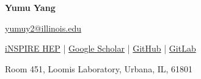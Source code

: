 \documentclass[a4paper,11pt]{article}
\newcommand{\socialicon}[1]{\raisebox{-0.05em}{\resizebox{!}{1em}{#1}}}
\newcommand{\ieeeicon}[1]{\raisebox{-0.3em}{\resizebox{!}{1.3em}{#1}}}
\newcommand{\headerfontiii}{\fontfamily{ppl}\selectfont} %
\begin{document}
\headerfontiii

\begin{center}
    {\Huge\textbf{Yumu Yang}}
\end{center}
\vspace{-6mm}

\begin{center}
    \small{
    \href{mailto:yumuy2@illinois.edu}{yumuy2@illinois.edu}
    }
\end{center}
\vspace{-6mm}


\begin{center}
    \small{
    \href{https://inspirehep.net/authors/2846994}{iNSPIRE HEP} | \href{https://scholar.google.com/citations?view_op=list_works&hl=en&authuser=2&user=IGMIu-YAAAAJ&gmla=AFix5MbLCgZJovHFGswMy-W1eY1dQgfcuqaAbQIVuql5PNr780VyF_W1nev4Ymeny46J9O8QFbclXwziwZRWiyED2k6ist12uWd93hBvlA}{Google Scholar} | \href{https://github.com/yumuy2}{GitHub} | 
    \href{https://gitlab.com/yumuy2}{GitLab}
    }
\end{center}
\vspace{-6mm}

\begin{center}
    \small{Room 451, Loomis Laboratory, Urbana, IL, 61801}
\end{center}

\vspace{-4mm}












\end{document}
